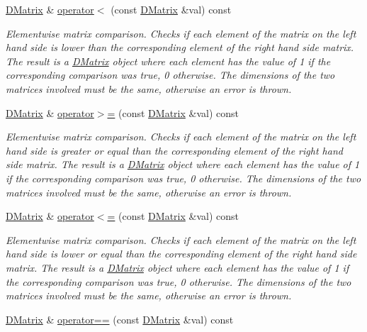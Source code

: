 \begin{DoxyCompactItemize}
\hyperlink{classDMatrix}{DMatrix} \& \hyperlink{classDMatrix_ac488bfc1076b6e69fdb8cb8e37acdff4}{operator$<$} (const \hyperlink{classDMatrix}{DMatrix} \&val) const 
\begin{DoxyCompactList}\small\item\em Elementwise matrix comparison. Checks if each element of the matrix on the left hand side is lower than the corresponding element of the right hand side matrix. The result is a \hyperlink{classDMatrix}{DMatrix} object where each element has the value of 1 if the corresponding comparison was true, 0 otherwise. The dimensions of the two matrices involved must be the same, otherwise an error is thrown. \item\end{DoxyCompactList}\item 
\hyperlink{classDMatrix}{DMatrix} \& \hyperlink{classDMatrix_ac17447effdb7cfc9252bf5232c3e99d6}{operator$>$=} (const \hyperlink{classDMatrix}{DMatrix} \&val) const 
\begin{DoxyCompactList}\small\item\em Elementwise matrix comparison. Checks if each element of the matrix on the left hand side is greater or equal than the corresponding element of the right hand side matrix. The result is a \hyperlink{classDMatrix}{DMatrix} object where each element has the value of 1 if the corresponding comparison was true, 0 otherwise. The dimensions of the two matrices involved must be the same, otherwise an error is thrown. \item\end{DoxyCompactList}\item 
\hyperlink{classDMatrix}{DMatrix} \& \hyperlink{classDMatrix_a220c708ecc6554de0abf07788eb9ab89}{operator$<$=} (const \hyperlink{classDMatrix}{DMatrix} \&val) const 
\begin{DoxyCompactList}\small\item\em Elementwise matrix comparison. Checks if each element of the matrix on the left hand side is lower or equal than the corresponding element of the right hand side matrix. The result is a \hyperlink{classDMatrix}{DMatrix} object where each element has the value of 1 if the corresponding comparison was true, 0 otherwise. The dimensions of the two matrices involved must be the same, otherwise an error is thrown. \item\end{DoxyCompactList}\item 
\hyperlink{classDMatrix}{DMatrix} \& \hyperlink{classDMatrix_a9851dca0d4acb9001926dfef3d4226b8}{operator==} (const \hyperlink{classDMatrix}{DMatrix} \&val) const 

\end{DoxyCompactItemize}
